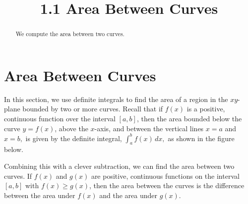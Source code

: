 \documentclass{ximera}
\title{1.1 Area Between Curves}
\begin{document}
\begin{abstract}
We compute the area between two curves.
\end{abstract}

\maketitle

\section{Area Between Curves}

In this section, we use definite integrals to find the area of a region 
in the $xy$-plane bounded by two or more curves. Recall that if $f(x)$ is a positive, continuous function 
over the interval $[a, b]$, then the area bounded below the curve $ y= f(x)$, above the $x$-axis, and between the 
vertical lines $x = a$
and $x = b,$ is given by the definite integral, $\int_a^b f(x) \, dx,$ as shown in the figure below.


\begin{image}
\end{image}


Combining this with a clever subtraction, we can find the area between two curves.
If $f(x)$ and $g(x)$ are positive, continuous functions on the interval $[a,b]$ with $f(x) \geq g(x)$,
then the area between the curves is the difference between the area under $f(x)$ and the area under $g(x)$.
\end{document}
